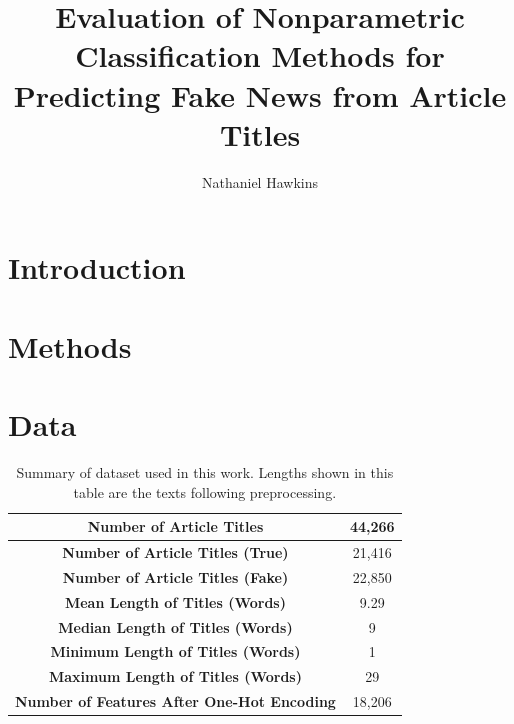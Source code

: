 \documentclass[12pt]{article}
\title{Evaluation of Nonparametric Classification Methods for Predicting Fake News from Article Titles}
\author{Nathaniel Hawkins}
\date{}
\begin{document}
	\maketitle
	
	\section{Introduction}
	
	
	
	\section{Methods}
	
	\lipsum[2]
	
	\section{Data}

    \begin{table}
    \begin{center}
        \begin{tabular}{|c|c|}
            \hline
            \textbf{Number of Article Titles}&44,266\\
            \hline
            \textbf{Number of Article Titles (True)}&21,416\\
            \hline
            \textbf{Number of Article Titles (Fake)}&22,850\\
            \hline
            \textbf{Mean Length of Titles (Words)}&9.29\\
            \hline
            \textbf{Median Length of Titles (Words)}&9\\
            \hline
            \textbf{Minimum Length of Titles (Words)}&1\\
            \hline
            \textbf{Maximum Length of Titles (Words)}&29\\
            \hline
            \textbf{Number of Features After One-Hot Encoding}&18,206\\
            \hline
        \end{tabular}
        \caption{Summary of dataset used in this work. Lengths shown in this table are the texts following preprocessing.}
        \label{table:1}
    \end{center}  
    \end{table} 	
    
\end{document}
